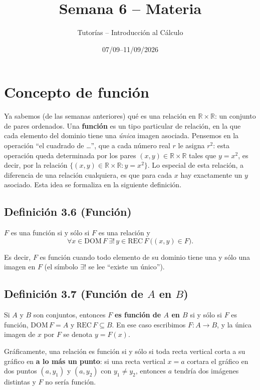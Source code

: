 \documentclass[11pt]{article}
\title{Semana 6 -- Materia}
\author{Tutorías -- Introducción al Cálculo}
\date{07/09--11/09/2026}
\begin{document}
\maketitle

\section{Concepto de función}

Ya sabemos (de las semanas anteriores) qué es una relación en $\mathbb{R} \times \mathbb{R}$: un
conjunto de pares ordenados. Una \textbf{función} es un tipo particular de relación, en la que cada
elemento del dominio tiene una \emph{única} imagen asociada. Pensemos en la operación ``el cuadrado
de \ldots'', que a cada número real $r$ le asigna $r^2$: esta operación queda determinada por los
pares $(x,y) \in \mathbb{R}\times\mathbb{R}$ tales que $y=x^2$, es decir, por la relación
$\{(x,y)\in\mathbb{R}\times\mathbb{R} : y=x^2\}$. Lo especial de esta relación, a diferencia de una
relación cualquiera, es que para cada $x$ hay exactamente un $y$ asociado. Esta idea se formaliza en
la siguiente definición.

\subsection*{Definición 3.6 (Función)}

$F$ es una función si y sólo si $F$ es una relación y
\[
\forall x \in \text{DOM}\, F \ \exists! \, y \in \text{REC}\, F \ \big( (x,y) \in F \big).
\]

Es decir, $F$ es función cuando todo elemento de su dominio tiene una y sólo una imagen en $F$
(el símbolo $\exists!$ se lee ``existe un único'').

\subsection*{Definición 3.7 (Función de $A$ en $B$)}

Si $A$ y $B$ son conjuntos, entonces $F$ \textbf{es función de $A$ en $B$} si y sólo si $F$ es
función, $\text{DOM}\, F = A$ y $\text{REC}\, F \subseteq B$. En ese caso escribimos $F : A \to B$,
y la única imagen de $x$ por $F$ se denota $y = F(x)$.

Gráficamente, una relación es función si y sólo si toda recta vertical corta a su gráfico en
\textbf{a lo más un punto}: si una recta vertical $x = a$ cortara el gráfico en dos puntos
$(a, y_1)$ y $(a, y_2)$ con $y_1 \neq y_2$, entonces $a$ tendría dos imágenes distintas y $F$ no
sería función.
\end{document}
